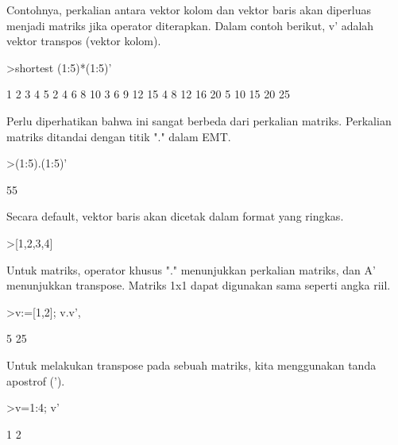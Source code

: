 \documentclass[a4paper,10pt]{article}
\begin{document}
\begin{eulernotebook}
\begin{eulercomment}
\begin{eulercomment}
\begin{eulercomment}
\begin{eulercomment}
\begin{eulercomment}
\begin{eulercomment}
\begin{eulercomment}
Contohnya, perkalian antara vektor kolom dan vektor baris akan
diperluas menjadi matriks jika operator diterapkan. Dalam contoh
berikut, v' adalah vektor transpos (vektor kolom).
\end{eulercomment}
\begin{eulerprompt}
>shortest (1:5)*(1:5)'
\end{eulerprompt}
\begin{euleroutput}
       1      2      3      4      5 
       2      4      6      8     10 
       3      6      9     12     15 
       4      8     12     16     20 
       5     10     15     20     25 
\end{euleroutput}
\begin{eulercomment}
Perlu diperhatikan bahwa ini sangat berbeda dari perkalian matriks.
Perkalian matriks ditandai dengan titik "." dalam EMT.
\end{eulercomment}
\begin{eulerprompt}
>(1:5).(1:5)'
\end{eulerprompt}
\begin{euleroutput}
  55
\end{euleroutput}
\begin{eulercomment}
Secara default, vektor baris akan dicetak dalam format yang ringkas.
\end{eulercomment}
\begin{eulerprompt}
>[1,2,3,4]
\end{eulerprompt}
\begin{euleroutput}
  [1,  2,  3,  4]
\end{euleroutput}
\begin{eulercomment}
Untuk matriks, operator khusus "." menunjukkan perkalian matriks, dan
A' menunjukkan transpose. Matriks 1x1 dapat digunakan sama seperti
angka riil.
\end{eulercomment}
\begin{eulerprompt}
>v:=[1,2]; v.v', %
\end{eulerprompt}
\begin{euleroutput}
  5
  25
\end{euleroutput}
\begin{eulercomment}
Untuk melakukan transpose pada sebuah matriks, kita menggunakan tanda
apostrof (').
\end{eulercomment}
\begin{eulerprompt}
>v=1:4; v'
\end{eulerprompt}
\begin{euleroutput}
              1 
              2 

\end{euleroutput}
\end{eulercomment}
\end{eulercomment}
\end{eulercomment}
\end{eulercomment}
\end{eulercomment}
\end{eulercomment}
\end{eulernotebook}
\end{document}
